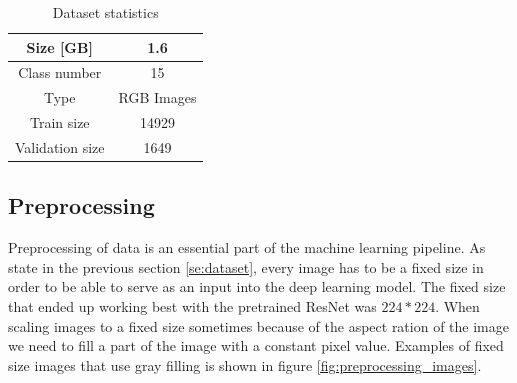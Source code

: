 \documentclass[times, utf8, diplomski]{fer}
\begin{document}
\begin{table}
\centering
\caption{Dataset statistics}
\label{tb:dataset_statistics}
\begin{tabular}{cc}
\hline 
Size [GB] & 1.6 \\ \hline 
Class number & 15 \\ 
Type & RGB Images \\ 
Train size & 14929 \\
Validation size & 1649 \\
\hline 
\end{tabular} 
\end{table}

\subsection{Preprocessing}
Preprocessing of data is an essential part of the machine learning pipeline. As state in the previous section \ref{se:dataset}, every image has to be a fixed size in order to be able to serve as an input into the deep learning model. The fixed size that ended up working best with the pretrained ResNet was $224 * 224$. When scaling images to a fixed size sometimes because of the aspect ration of the image we need to fill a part of the image with a constant pixel value. Examples of fixed size images that use gray filling is shown in figure \ref{fig:preprocessing_images}.
\end{document}
